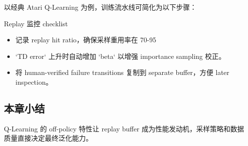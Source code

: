 以经典 Atari Q-Learning 为例，训练流水线可简化为以下步骤：


\begin{importantbox}{Replay 监控 checklist}
\begin{itemize}
    \item 记录 replay hit ratio，确保采样重用率在 70-95%
    \item `TD error` 上升时自动增加 `beta` 以增强 importance sampling 校正。
    \item 将 human-verified failure transitions 复制到 separate buffer，方便 later inspection。
\end{itemize}
\end{importantbox}

\subsection{本章小结}

Q-Learning 的 off-policy 特性让 replay buffer 成为性能发动机，采样策略和数据质量直接决定最终泛化能力。

